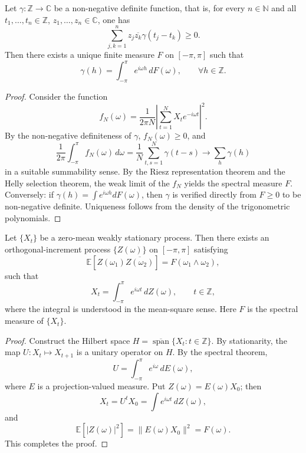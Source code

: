 \begin{theorem}\label{thm:herglotz}
Let $\gamma:\mathbb Z\to\mathbb C$ be a non-negative definite function, that is, for every $n\in\mathbb N$ and all $t_1,\dots,t_n\in\mathbb Z$, $z_1,\dots,z_n\in\mathbb C$, one has
\[
\sum_{j,k=1}^{n}z_j\overline{z_k}\gamma(t_j-t_k)\ge0.
\]
Then there exists a unique finite measure $F$ on $[-\pi,\pi]$ such that
\[
\gamma(h)=\int_{-\pi}^{\pi}e^{i\omega h}\,dF(\omega),\qquad \forall h\in\mathbb Z.
\]
\end{theorem}

\begin{proof}
Consider the function
\[
f_N(\omega)=\frac{1}{2\pi N}\left|\sum_{t=1}^{N}X_t e^{-i\omega t}\right|^2.
\]
By the non-negative definiteness of $\gamma$, $f_N(\omega)\ge0$, and
\[
\frac{1}{2\pi}\int_{-\pi}^{\pi}f_N(\omega)\,d\omega
=\frac{1}{N}\sum_{t,s=1}^{N}\gamma(t-s)
\to \sum_h\gamma(h)
\]
in a suitable summability sense. By the Riesz representation theorem and the Helly selection theorem, the weak limit of the $f_N$ yields the spectral measure $F$. Conversely: if $\gamma(h)=\int e^{i\omega h}dF(\omega)$, then $\gamma$ is verified directly from $F\ge0$ to be non-negative definite. Uniqueness follows from the density of the trigonometric polynomials.
\end{proof}

\begin{theorem}\label{thm:cramer}
Let $\{X_t\}$ be a zero-mean weakly stationary process. Then there exists an orthogonal-increment process $\{Z(\omega)\}$ on $[-\pi,\pi]$ satisfying
\[
\mathbb E[Z(\omega_1)\overline{Z(\omega_2)}]=F(\omega_1\wedge\omega_2),
\]
such that
\[
X_t=\int_{-\pi}^{\pi}e^{i\omega t}\,dZ(\omega),\qquad t\in\mathbb Z,
\]
where the integral is understood in the mean-square sense. Here $F$ is the spectral measure of $\{X_t\}$.
\end{theorem}

\begin{proof}
Construct the Hilbert space $H=\overline{\operatorname{span}}\{X_t:t\in\mathbb Z\}$. By stationarity, the map $U:X_t\mapsto X_{t+1}$ is a unitary operator on $H$. By the spectral theorem,
\[
U=\int_{-\pi}^{\pi}e^{i\omega}\,dE(\omega),
\]
where $E$ is a projection-valued measure. Put $Z(\omega)=E(\omega)X_0$; then
\[
X_t=U^tX_0=\int e^{i\omega t}\,dZ(\omega),
\]
and
\[
\mathbb E[|Z(\omega)|^2]=\|E(\omega)X_0\|^2=F(\omega).
\]
This completes the proof.
\end{proof}

